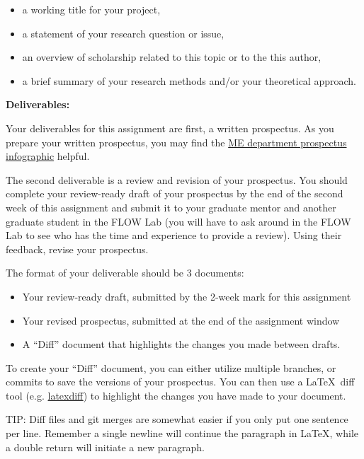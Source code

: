 \documentclass[12pt]{article}
\begin{document}
\begin{itemize}
	\item a working title for your project,
	\item a statement of your research question or issue,
	\item an overview of scholarship related to this topic or to the this author,
	\item a brief summary of your research methods and/or your theoretical approach.
\end{itemize}

\noindent \textbf{Deliverables:}

Your deliverables for this assignment are first, a written prospectus.
As you prepare your written prospectus, you may find the \href{https://www.me.byu.edu/00000177-4afb-d009-abf7-ebff31d50000/prospectus-outline-pdf-pdf}{ME department prospectus infographic} helpful.

The second deliverable is a review and revision of your prospectus.
You should complete your review-ready draft of your prospectus by the end of the second week of this assignment and submit it to your graduate mentor and another graduate student in the FLOW Lab (you will have to ask around in the FLOW Lab to see who has the time and experience to provide a review).
Using their feedback, revise your prospectus.

The format of your deliverable should be 3 documents:
\begin{itemize}
	\item Your review-ready draft, submitted by the 2-week mark for this assignment
	\item Your revised prospectus, submitted at the end of the assignment window
	\item A ``Diff'' document that highlights the changes you made between drafts.
\end{itemize}

To create your ``Diff'' document, you can either utilize multiple branches, or commits to save the versions of your prospectus.
You can then use a \LaTeX~diff tool (e.g. \href{https://texblog.org/2018/08/14/track-changes-with-latexdiff/}{latexdiff}) to highlight the changes you have made to your document.

\bigskip

TIP: Diff files and git merges are somewhat easier if you only put one sentence per line.
Remember a single newline will continue the paragraph in \LaTeX, while a double return will initiate a new paragraph.
\end{document}
